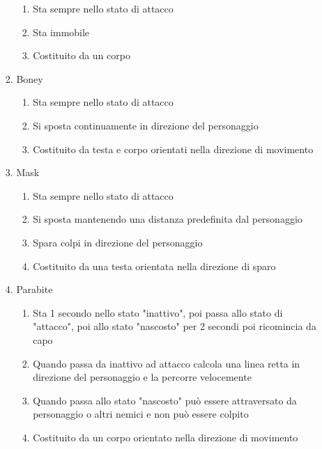 \begin{enumerate}
\begin{enumerate}
\begin{enumerate}
\begin{enumerate}
                        \item Sta sempre nello stato di attacco
                        \item Sta immobile
                        \item Costituito da un corpo
                    \end{enumerate}
                \item Boney
                    \begin{enumerate}
                        \item Sta sempre nello stato di attacco
                        \item Si sposta continuamente in direzione del personaggio
                        \item Costituito da testa e corpo orientati nella direzione di movimento
                    \end{enumerate}
                \item Mask
                    \begin{enumerate}
                        \item Sta sempre nello stato di attacco
                        \item Si sposta mantenendo una distanza predefinita dal personaggio
                        \item Spara colpi in direzione del personaggio
                        \item Costituito da una testa orientata nella direzione di sparo
                    \end{enumerate}
                \item Parabite
                    \begin{enumerate}
                        \item Sta 1 secondo nello stato "inattivo", poi passa allo stato di "attacco", poi allo stato "nascosto" per 2 secondi poi ricomincia da capo
                        \item Quando passa da inattivo ad attacco calcola una linea retta in direzione del personaggio e la percorre velocemente
                        \item Quando passa allo stato "nascosto" può essere attraversato da personaggio o altri nemici e non può essere colpito
                        \item Costituito da un corpo orientato nella direzione di movimento
                    \end{enumerate}
            \end{enumerate}

\end{enumerate}
\end{enumerate}
